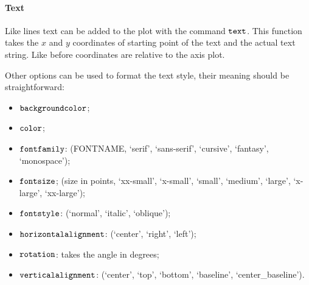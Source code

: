     \hypertarget{text}{%
\paragraph{Text}\label{text}}

Like lines text can be added to the plot with the command \(\tt{text}\).
This function takes the \(x\) and \(y\) coordinates of starting point of
the text and the actual text string. Like before coordinates are
relative to the axis plot.

Other options can be used to format the text style, their meaning should
be straightforward:

\begin{itemize}
\tightlist
\item
  \(\tt{backgroundcolor}\);
\item
  \(\tt{color}\);
\item
  \(\tt{fontfamily}\): (FONTNAME, `serif', `sans-serif', `cursive',
  `fantasy', `monospace');
\item
  \(\tt{fontsize}\); (size in points, `xx-small', `x-small', `small',
  `medium', `large', `x-large', `xx-large');
\item
  \(\tt{fontstyle}\): (`normal', `italic', `oblique');
\item
  \(\tt{horizontalalignment}\): (`center', `right', `left');
\item
  \(\tt{rotation}\): takes the angle in degrees;
\item
  \(\tt{verticalalignment}\): (`center', `top', `bottom', `baseline',
  `center\_baseline').
\end{itemize}

